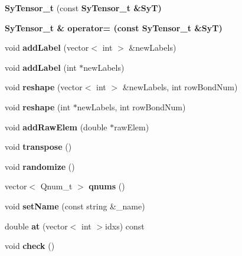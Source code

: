 \begin{CompactItemize}
\item 
\textbf{Sy\-Tensor\_\-t} (const \bf{Sy\-Tensor\_\-t} \&Sy\-T)\label{d1/d9f/classSyTensor__t_f78aebbd917afa2c1056f69e4db6722e}

\item 
\bf{Sy\-Tensor\_\-t} \& \textbf{operator=} (const \bf{Sy\-Tensor\_\-t} \&Sy\-T)\label{d1/d9f/classSyTensor__t_0a44eb0909a7e6da08b06d8a27c40f22}

\item 
void \textbf{add\-Label} (vector$<$ int $>$ \&new\-Labels)\label{d1/d9f/classSyTensor__t_764126669f8150a8e3fb0b05829e084d}

\item 
void \textbf{add\-Label} (int $\ast$new\-Labels)\label{d1/d9f/classSyTensor__t_187575ddc65a50a6c7a79173888419fd}

\item 
void \textbf{reshape} (vector$<$ int $>$ \&new\-Labels, int row\-Bond\-Num)\label{d1/d9f/classSyTensor__t_97069a4b531db9c3fa9bd943b8a4fcf7}

\item 
void \textbf{reshape} (int $\ast$new\-Labels, int row\-Bond\-Num)\label{d1/d9f/classSyTensor__t_2a024ef509402125d99b80290e8b09e3}

\item 
void \textbf{add\-Raw\-Elem} (double $\ast$raw\-Elem)\label{d1/d9f/classSyTensor__t_6383dba2b1d94384086943ced05ec44b}

\item 
void \textbf{transpose} ()\label{d1/d9f/classSyTensor__t_974656ad60918fb50e8b8f5e32b40fd6}

\item 
void \textbf{randomize} ()\label{d1/d9f/classSyTensor__t_6b4ec04e9f0f708e7bc57a37c15a1cef}

\item 
vector$<$ Qnum\_\-t $>$ \textbf{qnums} ()\label{d1/d9f/classSyTensor__t_e5a2ebf44357a6eca5e5989da1cfd09d}

\item 
void \textbf{set\-Name} (const string \&\_\-name)\label{d1/d9f/classSyTensor__t_dd9c602aa43871713082e61ab90a2dd3}

\item 
double \textbf{at} (vector$<$ int $>$idxs) const \label{d1/d9f/classSyTensor__t_7e3ebd2e17eb7e230bac7bcf446e0377}

\item 
void \textbf{check} ()\label{d1/d9f/classSyTensor__t_36c4686657aac7670110375531ef91cd}


\end{CompactItemize}
